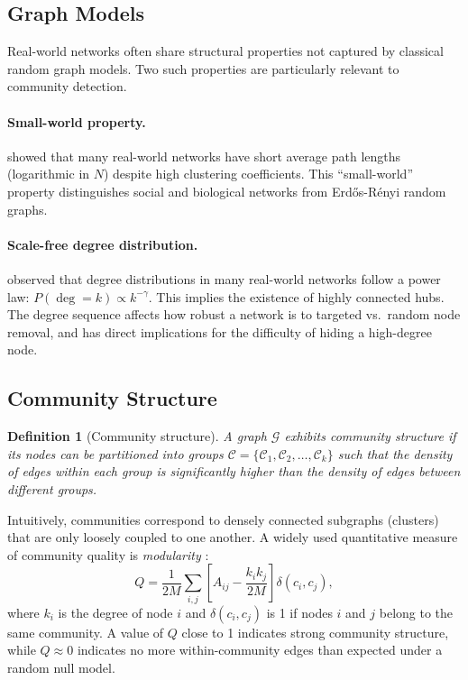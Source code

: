 \documentclass[11pt,a4paper,twoside]{tesis}
\newtheorem{definition}{Definition}[chapter]
\newcommand{\G}{\mathcal{G}}
\newcommand{\C}{\mathcal{C}}
\begin{document}
\subsection{Graph Models}

Real-world networks often share structural properties not captured by classical random
graph models. Two such properties are particularly relevant to community detection.

\paragraph{Small-world property.}
\textcite{watts1998smallworld} showed that many real-world networks have short average
path lengths (logarithmic in $N$) despite high clustering coefficients. This
``small-world'' property distinguishes social and biological networks from Erd\H{o}s-R\'enyi
random graphs.

\paragraph{Scale-free degree distribution.}
\textcite{barabasi1999scalefree} observed that degree distributions in many real-world
networks follow a power law: $P(\deg = k) \propto k^{-\gamma}$. This implies the
existence of highly connected hubs. The degree sequence affects how robust a network is
to targeted vs.\ random node removal, and has direct implications for the difficulty of
hiding a high-degree node.

\subsection{Community Structure}

\begin{definition}[Community structure]
A graph $\G$ exhibits \emph{community structure} if its nodes can be partitioned into
groups $\C = \{\C_1, \C_2, \ldots, \C_k\}$ such that the density of edges within each
group is significantly higher than the density of edges between different groups.
\end{definition}

Intuitively, communities correspond to densely connected subgraphs (clusters) that are
only loosely coupled to one another. A widely used quantitative measure of community
quality is \emph{modularity} \cite{newman2006modularity}:
\[
Q = \frac{1}{2M}\sum_{i,j}\left[A_{ij} - \frac{k_i k_j}{2M}\right]\delta(c_i, c_j),
\]
where $k_i$ is the degree of node $i$ and $\delta(c_i,c_j)$ is 1 if nodes $i$ and $j$
belong to the same community. A value of $Q$ close to 1 indicates strong community
structure, while $Q \approx 0$ indicates no more within-community edges than expected
under a random null model.
\end{document}
